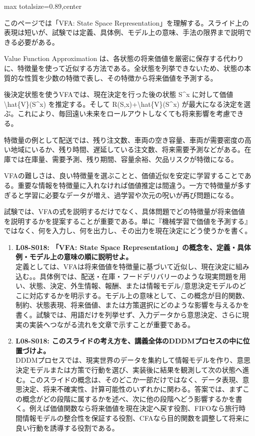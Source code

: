 \begin{minipage}[t]{0.58\textwidth}
\begin{adjustbox}{max totalsize={\textwidth}{0.89\textheight},center}
\begin{minipage}{\textwidth}\scriptsize
{}このページでは「VFA: State Space Representation」を理解する。スライド上の表現は短いが、試験では定義、具体例、モデル上の意味、手法の限界まで説明できる必要がある。\par
Value Function Approximation は、各状態の将来価値を厳密に保存する代わりに、特徴量を使って近似する方法である。全状態を列挙できないため、状態の本質的な性質を少数の特徴で表し、その特徴から将来価値を予測する。\par
後決定状態を使うVFAでは、現在決定を行った後の状態 S\textasciicircum{}x に対して価値 \textbackslash{}hat\{V\}(S\textasciicircum{}x) を推定する。そして R(S,x)+\textbackslash{}hat\{V\}(S\textasciicircum{}x) が最大になる決定を選ぶ。これにより、毎回遠い未来をロールアウトしなくても将来影響を考慮できる。\par
特徴量の例として配送では、残り注文数、車両の空き容量、車両が需要密度の高い地域にいるか、残り時間、遅延している注文数、将来需要予測などがある。在庫では在庫量、需要予測、残り期間、容量余裕、欠品リスクが特徴になる。\par
VFAの難しさは、良い特徴量を選ぶことと、価値近似を安定に学習することである。重要な情報を特徴量に入れなければ価値推定は間違う。一方で特徴量が多すぎると学習に必要なデータが増え、過学習や次元の呪いが再び問題になる。\par
試験では、VFAの式を説明するだけでなく、具体問題でどの特徴量が将来価値を説明するかを提案することが重要である。単に『機械学習で価値を予測する』ではなく、何を入力し、何を出力し、その出力を現在決定にどう使うかを書く。\par{}\begin{enumerate}\item \textbf{L08-S018: 「VFA: State Space Representation」の概念を、定義・具体例・モデル上の意味の順に説明せよ。}\\定義としては、VFAは将来価値を特徴量に基づいて近似し、現在決定に組み込む。。具体例では、配送・在庫・フードデリバリーのような現実問題を用い、状態、決定、外生情報、報酬、または情報モデル/意思決定モデルのどこに対応するかを明示する。モデル上の意味として、この概念が目的関数、制約、状態表現、将来価値、または方策選択にどのような影響を与えるかを書く。試験では、用語だけを列挙せず、入力データから意思決定、さらに現実の実装へつながる流れを文章で示すことが重要である。\item \textbf{L08-S018: このスライドの考え方を、講義全体のDDDMプロセスの中に位置づけよ。}\\DDDMプロセスでは、現実世界のデータを集約して情報モデルを作り、意思決定モデルまたは方策で行動を選び、実装後に結果を観測して次の状態へ進む。このスライドの概念は、そのどこか一部だけではなく、データ表現、意思決定、将来不確実性、計算可能性のいずれかに関わる。答案では、まずこの概念がどの段階に属するかを述べ、次に他の段階へどう影響するかを書く。例えば価値関数なら将来価値を現在決定へ戻す役割、FIFOなら旅行時間情報モデルの整合性を保証する役割、CFAなら目的関数を調整して将来に良い行動を誘導する役割である。\end{enumerate}

\end{minipage}
\end{adjustbox}
\end{minipage}
